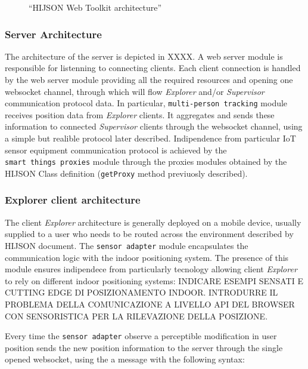 \documentclass{sig-alternate}
\begin{document}
\begin{figure}[!htbp]
\centering
{}
\caption{``HIJSON Web Toolkit architecture''}
\label{fig:pipeline}
\end{figure}

\subsubsection{Server Architecture}\label{server-architecture}

The architecture of the server is depicted in XXXX. A web server module
is responsible for listenning to connecting clients. Each client
connection is handled by the web server module providing all the
required resources and opening one websocket channel, through which will
flow \emph{Explorer} and/or \emph{Supervisor} communication protocol
data. In particular, \texttt{multi-person\ tracking} module receives
position data from \emph{Explorer} clients. It aggregates and sends
these information to connected \emph{Supervisor} clients through the
websocket channel, using a simple but realible protocol later described.
Indipendence from particular IoT sensor equipment communication protocol
is achieved by the \texttt{smart\ things\ proxies} module through the
proxies modules obtained by the HIJSON Class definition
(\texttt{getProxy} method previuosly described).

\subsubsection{Explorer client architecture}\label{client-explorer-architecture}

The client \emph{Explorer} architecture is generally deployed on a
mobile device, usually supplied to a user who needs to be routed across
the environment described by HIJSON document. The
\texttt{sensor\ adapter} module encapsulates the communication logic
with the indoor positioning system. The presence of this module ensures
indipendece from particularly tecnology allowing client \emph{Explorer}
to rely on different indoor positioning systems: INDICARE ESEMPI SENSATI
E CUTTING EDGE DI POSIZIONAMENTO INDOOR. INTRODURRE IL PROBLEMA DELLA
COMUNICAZIONE A LIVELLO API DEL BROWSER CON SENSORISTICA PER LA
RILEVAZIONE DELLA POSIZIONE.

Every time the \texttt{sensor\ adapter} observe a perceptible
modification in user position sends the new position information to the
server through the single opened websocket, using the a message with the
following syntax:
\end{document}
